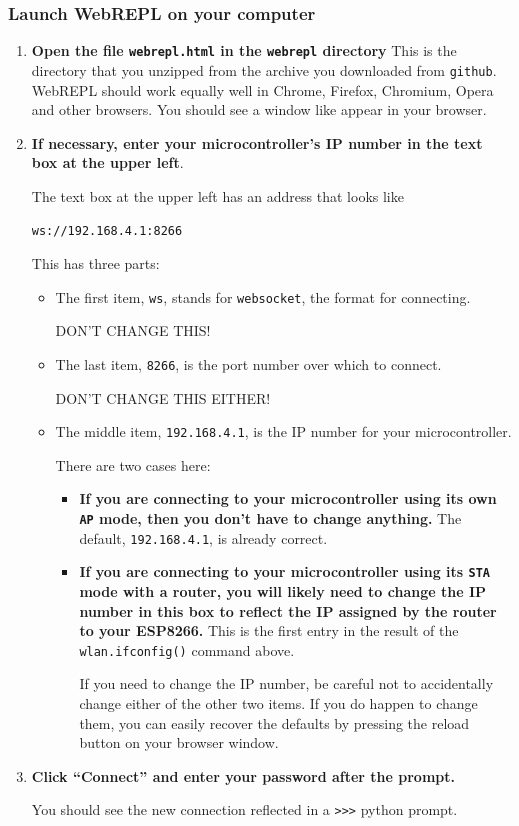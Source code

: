 \subsubsection{\howto Launch WebREPL on your computer}
\begin{enumerate}
	\item  \textbf{Open the file \texttt{webrepl.html} in the \texttt{webrepl} directory} 
	This is the directory that you unzipped from the archive you downloaded from \texttt{github}. 
	WebREPL should work equally well in Chrome, Firefox, Chromium, Opera and other browsers. 
	You should see a window like  appear in your browser. 

	\item \textbf{If necessary, enter your microcontroller's IP number in the text box at the upper left}.
	
	The text box at the upper left has an address that looks like
\begin{lstlisting}[language=bash]
ws://192.168.4.1:8266
\end{lstlisting}
	This has three parts: 
	\begin{itemize}
		\item The first item, \verb|ws|, stands for \texttt{websocket}, the format for connecting. 
		
		DON'T CHANGE THIS!
		
		\item The last item, \verb|8266|, is the port number over which to connect. 
		
		DON'T CHANGE THIS EITHER!
		
		\item The middle item, \verb|192.168.4.1|, is the IP number for your microcontroller.
	
		There are two cases here:
	\begin{itemize}
		\item \textbf{If you are connecting to your microcontroller using its own \texttt{AP} mode, then you don't have to change anything.} The default, \verb|192.168.4.1|, is already correct. 
		
		\item \textbf{If you are connecting to your microcontroller using its \texttt{STA} mode with a router, you will likely need to change the IP number in this box to reflect the IP assigned by the router to your ESP8266.} This is the first entry in the result of the \texttt{wlan.ifconfig()} command above.
		
		If you need to change the IP number, be careful not to accidentally change either of the other two items. 
		If you do happen to change them, you can easily recover the defaults by pressing the reload button on your browser window.
	\end{itemize}
	\end{itemize}
	

	\item \textbf{Click “Connect” and enter your password after the prompt.} 
	
	You should see the new connection reflected in a \verb|>>>| python prompt.

\end{enumerate}

